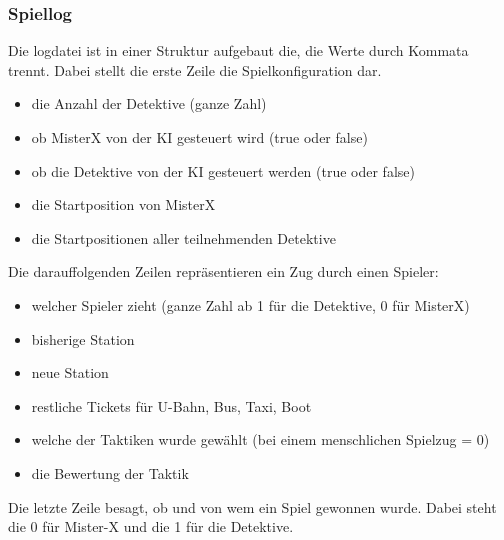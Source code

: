     \subsubsection{Spiellog}\label{log}
        Die logdatei ist in einer Struktur aufgebaut die, die Werte durch Kommata trennt.
        Dabei stellt die erste Zeile die Spielkonfiguration dar.
        \begin{itemize}
            \item die Anzahl der Detektive (ganze Zahl)
            \item ob MisterX von der KI gesteuert wird (true oder false)
            \item ob die Detektive von der KI gesteuert werden (true oder false)
            \item die Startposition von MisterX
            \item die Startpositionen aller teilnehmenden Detektive
        \end{itemize}
        Die darauffolgenden Zeilen repräsentieren ein Zug durch einen Spieler:
        \begin{itemize}
            \item welcher Spieler zieht (ganze Zahl ab 1 für die Detektive, 0 für MisterX)
            \item bisherige Station
            \item neue Station
            \item restliche Tickets für U-Bahn, Bus, Taxi, Boot
            \item welche der Taktiken wurde gewählt (bei einem menschlichen Spielzug = 0)
            \item die Bewertung der Taktik
        \end{itemize}
        Die letzte Zeile besagt, ob und von wem ein Spiel gewonnen wurde.
        Dabei steht die 0 für Mister-X und die 1 für die Detektive.
      